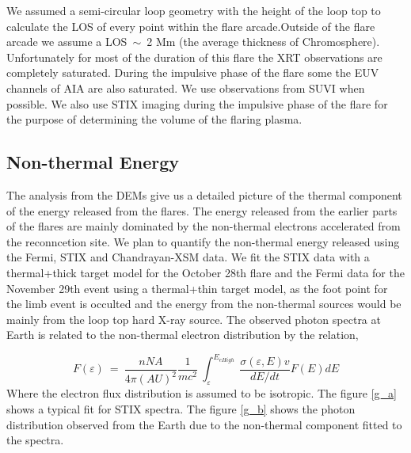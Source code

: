\documentclass[a4paper,11pt]{article}
\begin{document}
We assumed a semi-circular loop geometry with the height of the loop top to calculate the LOS of every point within the flare arcade.Outside of the flare arcade we assume a LOS~$\sim$~2 Mm (the average thickness of Chromosphere). Unfortunately for most of the duration of this flare the XRT observations are completely saturated. During the impulsive phase of the flare some the EUV channels of AIA are also saturated. We use observations from SUVI when possible. We also use  STIX imaging during the impulsive phase of the flare for the purpose of determining the volume of the flaring plasma.

\subsection*{Non-thermal Energy}

The analysis from the DEMs give us a detailed picture of the thermal component of the energy released from the flares. The energy released from the earlier parts of the flares are mainly dominated by the non-thermal electrons accelerated from the reconncetion site. We plan to quantify the non-thermal energy released using the Fermi, STIX and Chandrayan-XSM data.  We fit the STIX data with a thermal+thick target model for the October 28th flare and the Fermi data for the November 29th event using a thermal+thin target model, as the foot point for the limb event is occulted and the energy from the non-thermal sources would be mainly from the loop top hard X-ray source. The observed photon spectra at Earth is related to the non-thermal electron distribution by the relation,

\begin{equation*}
    F(\varepsilon)~=~\frac{nNA}{4\pi(AU)^{2}}\frac{1}{mc^{2}}~\int_{\varepsilon}^{E_{eHigh}}~\frac{\sigma(\varepsilon,E)v}{dE/dt}F(E)dE
\end{equation*}
Where the electron flux distribution is assumed to be isotropic. The figure \ref{g_a} shows a typical fit for STIX spectra.  The figure \ref{g_b} shows the photon distribution observed from the Earth due to the non-thermal component fitted to the spectra. 
\end{document}
